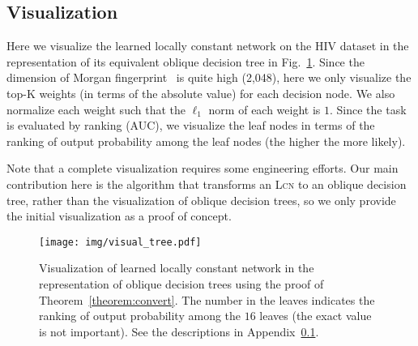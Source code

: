 \documentclass{article} \usepackage{iclr2020_conference,times}
\begin{document}
\subsection{Visualization}\label{appendix:visualization}

Here we visualize the learned locally constant network on the HIV dataset in the representation of its equivalent oblique decision tree in Fig.~\ref{fig:visualization}. Since the dimension of Morgan fingerprint~\citep{rogers2010extended} is quite high (2,048), here we only visualize the top-K weights (in terms of the absolute value) for each decision node. We also normalize each weight such that the $\ell_1$ norm of each weight is $1$. Since the task is evaluated by ranking (AUC), we visualize the leaf nodes in terms of the ranking of output probability among the leaf nodes (the higher the more likely). 


Note that a complete visualization requires some engineering efforts. Our main contribution here is the algorithm that transforms an \textsc{Lcn} to an oblique decision tree, rather than the visualization of oblique decision trees, so we only provide the initial visualization as a proof of concept. 



\begin{figure}
\vspace{-1mm}
	\centering
	\texttt{[image: img/visual\_tree.pdf]}
	\caption{Visualization of learned locally constant network in the representation of oblique decision trees using the proof of Theorem~\ref{theorem:convert}. The number in the leaves indicates the ranking of output probability among the $16$ leaves (the exact value is not important). See the descriptions in Appendix~\ref{appendix:visualization}.}\label{fig:visualization}
    \vspace{-2.5mm}
\end{figure}
 
\end{document}
